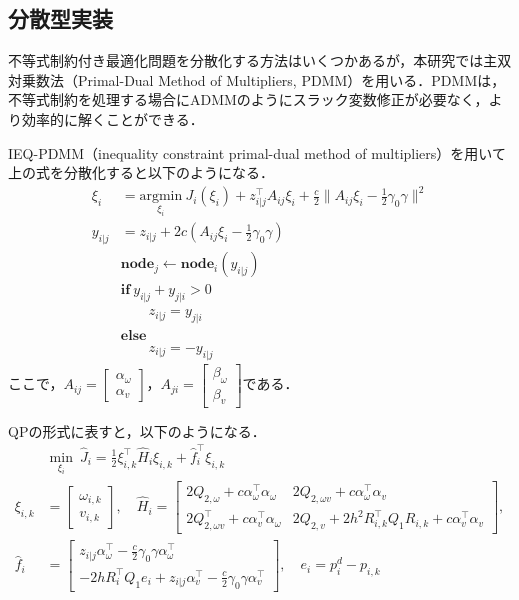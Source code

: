 \subsection{分散型実装}

不等式制約付き最適化問題を分散化する方法はいくつかあるが，本研究では主双対乗数法（Primal-Dual Method of Multipliers, PDMM）を用いる．PDMMは，不等式制約を処理する場合にADMMのようにスラック変数修正が必要なく，より効率的に解くことができる\cite{Zhang2024}．

IEQ-PDMM（inequality constraint primal-dual method of multipliers）を用いて上の式を分散化すると以下のようになる．
\begin{equation}
\begin{aligned}
\xi_i &= \underset{\xi_i}{\mathrm{argmin}} \:J_i(\xi_i)+z_{i|j}^\top A_{ij}\xi_i+\frac{c}{2}\|A_{ij}\xi_i-\frac{1}{2}\gamma_0\gamma\|^2 \\
y_{i|j} &= z_{i|j}+2c(A_{ij}\xi_{i}-\frac{1}{2}\gamma_0\gamma) \\
&\mathbf{node}_j\leftarrow \mathbf{node}_i(y_{i|j}) \\
&\mathbf{if}\:y_{i|j}+y_{j|i}>0 \\
&\qquad z_{i|j}=y_{j|i} \\
&\mathbf{else}\: \\
&\qquad z_{i|j}=-y_{i|j}
\label{eq:pdmm}
\end{aligned}
\end{equation}
ここで，$A_{ij} = \begin{bmatrix} \alpha_\omega \\ \alpha_v \end{bmatrix}$，$A_{ji} = \begin{bmatrix} \beta_\omega \\ \beta_v \end{bmatrix}$である．

QPの形式に表すと，以下のようになる．
\begin{equation}
\begin{aligned}
&\min_{\xi_i}\:\hat{J}_i = \frac{1}{2}\xi_{i,k}^\top \hat{H}_i\xi_{i,k} + \hat{f}_i^\top \xi_{i,k} \\
\xi_{i,k} &= \begin{bmatrix}
\omega_{i,k}\\v_{i,k}
\end{bmatrix}, \quad
\hat{H}_i = \begin{bmatrix}
2Q_{2,\omega}+c\alpha_\omega^\top \alpha_\omega & 2Q_{2,\omega v}+c\alpha_\omega^\top \alpha_v \\
2Q^\top_{2,\omega v}+c\alpha_v^\top \alpha_\omega & 2Q_{2,v}+2h^2R_{i,k}^\top Q_1R_{i,k}+c\alpha_v^\top \alpha_v
\end{bmatrix}, \\
\hat{f}_i &= \begin{bmatrix}
z_{i|j}\alpha_\omega^\top -\frac{c}{2}\gamma_0\gamma\alpha_\omega^\top \\
-2hR_i^\top Q_1 e_i+z_{i|j}\alpha_v^\top -\frac{c}{2}\gamma_0\gamma\alpha_v^\top
\end{bmatrix}, \quad e_i = p^d_{i}-p_{i,k}
\label{eq:pdmm_qp}
\end{aligned}
\end{equation}

